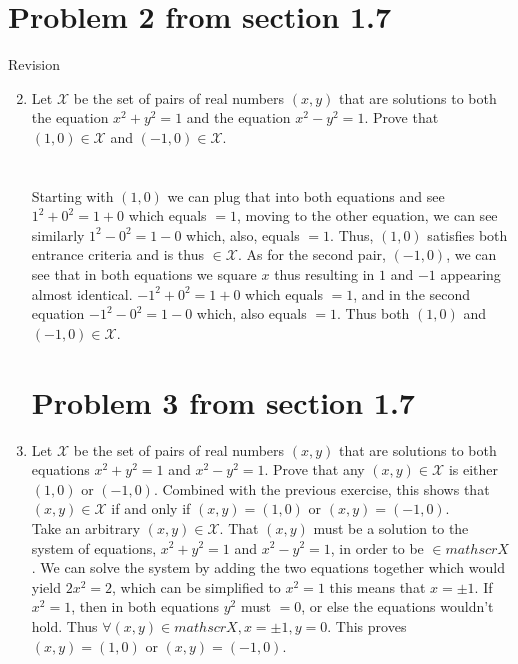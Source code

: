 \documentclass{article}
\begin{document}
\newpage

\section*{Problem 2 from section 1.7}
Revision 
\begin{enumerate}
    \setcounter{enumi}{1}
    \item Let $\mathscr{X}$ be the set of pairs of real numbers $(x, y)$ that are solutions to both the equation $x^2 + y^2 = 1$ and the equation $x^2 - y^2 = 1$. Prove that $(1, 0) \in \mathscr{X}$ and $(-1, 0) \in \mathscr{X}$. \\
    \\
    \\ Starting with $(1, 0)$ we can plug that into both equations and see $1^2 + 0^2 = 1 + 0$ which equals $= 1$, moving to the other equation, we can see similarly $1^2 - 0^2 = 1 - 0$ which, also, equals $= 1$. Thus, $(1, 0)$ satisfies both entrance criteria and is thus $\in \mathscr{X}$. As for the second pair, $(-1, 0)$, we can see that in both equations we square $x$ thus resulting in $1$ and $-1$ appearing almost identical. $-1^2 + 0^2 = 1 + 0$ which equals $= 1$, and in the second equation $-1^2 - 0^2 = 1 - 0$ which, also equals $= 1$. Thus both $(1, 0)$ and $(-1, 0)\in \mathscr{X}$. 
    \newpage

    \section*{Problem 3 from section 1.7}
    \item Let $\mathscr{X}$ be the set of pairs of real numbers $(x, y)$ that are solutions to both equations $x^2 + y^2 = 1$ and $x^2 - y^2 = 1$. Prove that any $(x, y) \in \mathscr{X}$ is either $(1, 0)$ or $(-1, 0)$. Combined with the previous exercise, this shows that $(x, y) \in \mathscr{X}$ if and only if $(x, y) = (1, 0)$ or $(x, y) = (-1, 0)$.
    \\
    Take an arbitrary $(x, y) \in \mathscr{X}$. That $(x,y)$ must be a solution to the system of equations, $x^2 + y^2 = 1$ and $x^2 - y^2 = 1$, in order to be $\in mathscr{X}$. We can solve the system by adding the two equations together which would yield $2x^2 = 2$, which can be simplified to $x^2 = 1$ this means that $x = \pm 1$. If $x^2 = 1$, then in both equations $y^2$ must $ = 0$, or else the equations wouldn't hold. Thus $\forall (x,y) \in mathscr{X}, x = \pm 1, y = 0$. This proves $(x, y) = (1, 0)$ or $(x, y) = (-1, 0)$.
    \\ 
    

\end{enumerate}
\end{document}
